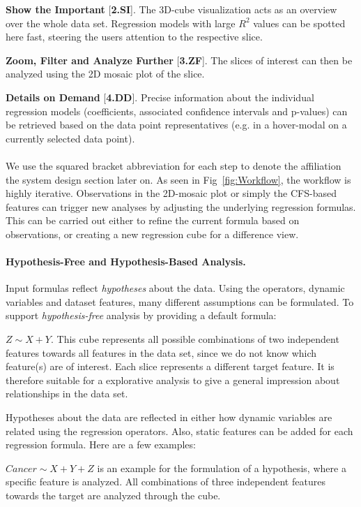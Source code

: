 \documentclass[journal]{style/vgtc} 			          %
\begin{document}
\textbf{Show the Important} [\textbf{2.SI}]. The 3D-cube visualization acts as an overview over the whole data set.
Regression models with large $R^2$ values can be spotted here fast, steering the users attention to the respective slice.

\textbf{Zoom, Filter and Analyze Further} [\textbf{3.ZF}]. The slices of interest can then be analyzed using the 2D mosaic plot of the slice.

\textbf{Details on Demand} [\textbf{4.DD}]. Precise information about the individual regression models (coefficients, associated confidence intervals and p-values) can be retrieved based on the data point representatives (e.g. in a hover-modal on a currently selected data point).
\\\\
We use the squared bracket abbreviation for each step to denote the affiliation the system design section later on.
As seen in Fig~\ref{fig:Workflow}, the workflow is highly iterative.
Observations in the 2D-mosaic plot or simply the CFS-based features can trigger new analyses by adjusting the underlying regression formulas.
This can be carried out either to refine the current formula based on observations, or creating a new regression cube for a difference view.
\paragraph{Hypothesis-Free and Hypothesis-Based Analysis.}
Input formulas reflect \emph{hypotheses} about the data.
Using the operators, dynamic variables and dataset features, many different assumptions can be formulated.
To support \emph{hypothesis-free} analysis by providing a default formula:

$Z \sim X + Y$.
This cube represents all possible combinations of two independent features towards all features in the data set, since we do not know which feature(s) are of interest.
Each slice represents a different target feature.
It is therefore suitable for a explorative analysis to give a general impression about relationships in the data set.

Hypotheses about the data are reflected in either how dynamic variables are related using the regression operators.
Also, static features can be added for each regression formula.
Here are a few examples:

$Cancer \sim X + Y + Z$ is an example for the formulation of a hypothesis, where a specific feature is analyzed.
All combinations of three independent features towards the target are analyzed through the cube.
\end{document}
